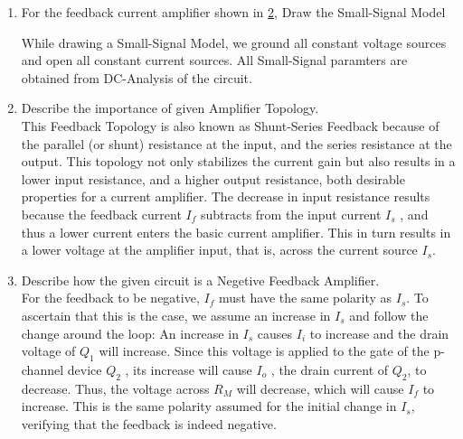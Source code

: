 \begin{enumerate}[label=\thesubsection.\arabic*.,ref=\thesubsection.\theenumi]

\item For the feedback current amplifier shown in \ref{fig:Input}, Draw the Small-Signal Model
\begin{figure}[h!]
	\begin{center}
		\resizebox{\columnwidth/2}{!}{}
	\end{center}
	\caption{}
	\label{fig:Input}
\end{figure}

\solution
While drawing a Small-Signal Model, we ground all constant voltage sources and open all constant current sources. All Small-Signal paramters are obtained from DC-Analysis of the circuit.
\begin{figure}[h!]
	\begin{center}
		\resizebox{\columnwidth/2}{!}{}
	\end{center}
	\caption{}
	\label{fig:Input}
\end{figure}

\item Describe the importance of given Amplifier Topology.\\
\solution 
This Feedback Topology is also known as Shunt-Series Feedback because of the parallel (or shunt) resistance at the input, and the series resistance at the output. This topology not only stabilizes the current gain but also results in a lower input resistance, and a higher output resistance, both desirable properties for a current amplifier. The decrease in input resistance results because the feedback current $I_{f}$ subtracts from the input current $I_{s}$ , and thus a lower current enters the basic current amplifier. This in turn results in a lower voltage at the amplifier input, that is, across the current source $I_{s}$.

\item Describe how the given circuit is a Negetive Feedback Amplifier.\\
\solution 
For the feedback to be negative, $I_{f}$ must have the same polarity as $I_{s}$. To ascertain that this is the case, we assume an increase in $I_{s}$ and follow the change around the loop: An increase in $I_{s}$ causes $I_{i}$ to increase and the drain voltage of $Q_{1}$ will increase. Since this voltage is applied to the gate of the p-channel device $Q_{2}$ , its increase will cause $I_{o}$ , the drain current of $Q_{2}$, to decrease. Thus, the voltage across $R_{M}$ will decrease, which will cause $I_{f}$ to increase. This is the same polarity assumed for the initial change in
$I_{s}$, verifying that the feedback is indeed negative.


\end{enumerate}
